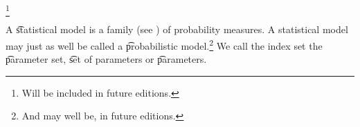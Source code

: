 
\footnote{Will be included in future editions.}


A \t{statistical model} is a family (see ) of probability measures.
A statistical model may just as well be called a \t{probabilistic model}.\footnote{And may well be, in future editions.}
We call the index set the \t{parameter set}, \t{set of parameters} or \t{parameters}.



\blankpage
